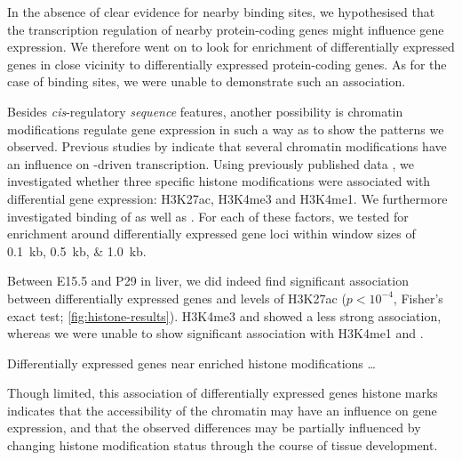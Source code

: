 In the absence of clear evidence for nearby \tf binding sites, we hypothesised
that the transcription regulation of nearby protein-coding genes might influence
\trna gene expression. We therefore went on to look for enrichment of
differentially expressed \trna genes in close vicinity to differentially
expressed protein-coding genes. As for the case of \tf binding sites, we were
unable to demonstrate such an association.

Besides \emph{cis}-regulatory \emph{sequence} features, another possibility is
chromatin modifications regulate \trna gene expression in such a way as to show
the patterns we observed. Previous studies by \citet{Barski:2010,Oler:2010}
indicate that several chromatin modifications have an influence on -driven
transcription. Using previously published data \citep{Shen:2012}, we
investigated whether three specific histone modifications were associated with
differential \trna gene expression: H3K27ac, H3K4me3 and H3K4me1. We furthermore
investigated binding of  as well as \ctcf. For each of these factors, we
tested for enrichment around differentially expressed \trna gene loci within
window sizes of \SIlist{0.1;0.5;1.0}{kb}.

Between E15.5 and P29 in liver, we did indeed find significant association
between differentially expressed \trna genes and levels of H3K27ac (\(p <
10^{-4}\), Fisher’s exact test; \cref{fig:histone-results}). H3K4me3 and 
showed a less strong association, whereas we were unable to show significant
association with H3K4me1 and \ctcf.

    {Differentially expressed \trna genes near enriched histone modifications}
    {…}

Though limited, this association of differentially expressed \trna genes histone
marks indicates that the accessibility of the chromatin may have an influence on
\trna gene expression, and that the observed differences may be partially
influenced by changing histone modification status through the course of tissue
development.

